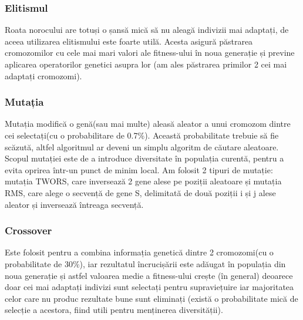 \documentclass{article}
\begin{document}
\subsubsection{Elitismul}
Roata norocului are totuși o șansă mică să nu aleagă indivizii mai adaptați, de aceea utilizarea elitismului este foarte utilă. Acesta asigură păstrarea cromozomilor cu cele mai mari valori ale fitness-ului în noua generație și previne aplicarea operatorilor genetici asupra lor (am ales păstrarea primilor 2 cei mai adaptați cromozomi).


\subsubsection{Mutația}
Mutația modifică o genă(sau mai multe) aleasă aleator a unui cromozom dintre cei selectați(cu o probabilitare de 0.7\%). Această probabilitate trebuie să fie scăzută, altfel algoritmul ar deveni un simplu algoritm de căutare aleatoare. Scopul mutației este de a introduce diversitate în populația curentă, pentru a evita oprirea într-un punct de minim local. 
Am folosit 2 tipuri de mutație: mutația TWORS, care inversează 2 gene alese pe poziții aleatoare și mutația RMS, care alege o secvență de gene S, delimitată de două poziții i și j alese aleator și inversează întreaga secvență.

\subsubsection{Crossover}
Este folosit pentru a combina informația genetică dintre 2 cromozomi(cu o probabilitate de 30\%), iar rezultatul încrucișării este adăugat în populația din noua generație și astfel valoarea medie a fitness-ului crește (în general) deoarece doar cei mai adaptați indivizi sunt selectați pentru supraviețuire iar majoritatea celor care nu produc rezultate bune sunt eliminați (există o probabilitate mică de selecție a acestora, fiind utili pentru menținerea diversității).

\break


\end{document}
